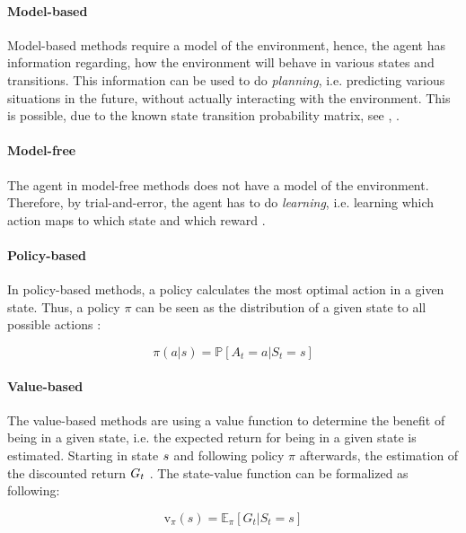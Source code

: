 \paragraph{Model-based}
Model-based methods require a model of the environment, hence, the agent has information regarding, how the environment will behave in various states and transitions. This information can be used to do \textit{planning}, i.e. predicting various situations in the future, without actually interacting with the environment. This is possible, due to the known state transition probability matrix, see , \cite{richardsutton2018}.

\paragraph{Model-free}
The agent in model-free methods does not have a model of the environment. Therefore, by trial-and-error, the agent has to do \textit{learning}, i.e. learning which action maps to which state and which reward \cite{richardsutton2018}.

\paragraph{Policy-based}
In policy-based methods, a policy calculates the most optimal action in a given state. Thus, a policy $\pi$ can be seen as the distribution of a given state to all possible actions \cite{Arulkumaran_2017}:

\begin{equation}
\pi(a|s) = \mathbb{P}[A_{t} = a | S_{t} = s]
\label{eq:policy_pi}
\end{equation}

\paragraph{Value-based}
The value-based methods are using a value function to determine the benefit of being in a given state, i.e. the expected return for being in a given state is estimated. Starting in state $\mathnormal{s}$ and following policy $\pi$ afterwards, the estimation of the discounted return $\mathnormal{G}_{t}$ \cite{Arulkumaran_2017}. The state-value function can be formalized as following:

\begin{equation}
\mathrm{v}_{\pi}(s)=\mathbb{E}_{\pi}[G_t|S_t=s]
\label{eq:state_val_func}
\end{equation}

